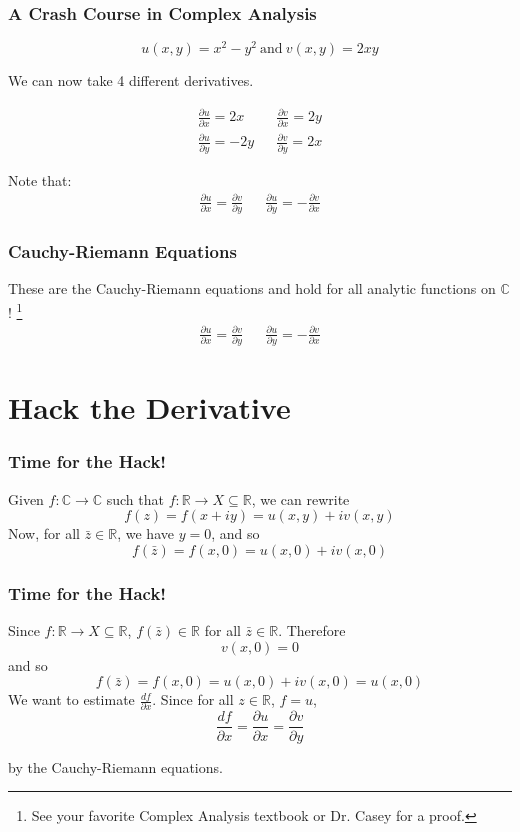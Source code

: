 \documentclass{beamer}
\def\R{\mathbb{R}}                     %
\def\C{\mathbb{C}}                     %
\begin{document}
\begin{frame}
\frametitle{A Crash Course in Complex Analysis}

\[ u(x,y) = x^2 - y^2 \ \mathrm{and} \ v(x,y) = 2xy \]

We can now take 4 different derivatives.

\begin{eqnarray*}
\frac{\partial u}{\partial x} = 2x && \frac{\partial v}{\partial x} = 2y \\
\frac{\partial u}{\partial y} = -2y && \frac{\partial v}{\partial y} = 2x
\end{eqnarray*}

\pause
  Note that:
  \begin{eqnarray*}
  \frac{\partial u}{\partial x} = \frac{\partial v}{\partial y} &&
  \frac{\partial u}{\partial y} = -\frac{\partial v}{\partial x}
  \end{eqnarray*}

\end{frame}

\begin{frame}
\frametitle{Cauchy-Riemann Equations}
  These are the Cauchy-Riemann equations and hold for all analytic functions on $\C$! \footnote{See your favorite Complex Analysis textbook or Dr. Casey for a proof.}
  \begin{eqnarray*}
  \frac{\partial u}{\partial x} = \frac{\partial v}{\partial y} &&
  \frac{\partial u}{\partial y} = -\frac{\partial v}{\partial x}
  \end{eqnarray*}

\end{frame}

\section{Hack the Derivative}
\begin{frame}
\frametitle{Time for the Hack!}

  Given $f: \C \to \C$ such that $f:\R \to X \subseteq \R$, we can rewrite
  \[ f(z) = f(x+iy) = u(x,y) + iv(x,y) \]
  \pause
  Now, for all $\bar{z} \in \R$, we have $y = 0$, and so
  \[ f(\bar{z}) = f(x,0) = u(x,0) + iv(x,0) \]

\end{frame}

\begin{frame}
\frametitle{Time for the Hack!}

  Since $f: \R \to X \subseteq \R$, $f(\bar{z}) \in \R$ for all $\bar{z} \in \R$. Therefore
  \[ v(x,0) = 0 \]
  \pause
  and so
  \[ f(\bar{z}) = f(x,0) = u(x,0) + iv(x,0) = u(x,0) \]
  \pause
  We want to estimate $\frac{df}{\partial x}$. Since for all $z \in \R$, $f = u$,
  \[ \frac{df}{\partial x} = \frac{\partial u}{\partial x} = \frac{\partial v}{\partial y} \]

  by the Cauchy-Riemann equations.

\end{frame}
\end{document}

